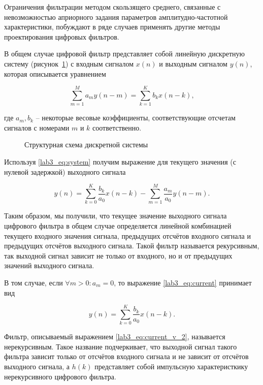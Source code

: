 Ограничения фильтрации методом скользящего среднего, связанные с невозможностью априорного задания параметров амплитудно-частотной характеристики, побуждают в ряде случаев применять другие методы проектирования цифровых фильтров.

В общем случае цифровой фильтр представляет собой линейную дискретную систему (рисунок~\ref{lab3_fig:structural_scheme}) с входным сигналом $x(n)$ и выходным сигналом $y(n)$, которая описывается уравнением

\begin{equation}
	\sum\limits_{m=1}^M a_m y (n-m) = \sum\limits_{k=1}^K b_k x (n-k),
	\label{lab3_eq:system}
\end{equation}

где $a_m, b_k$ – некоторые весовые коэффициенты, соответствующие отсчетам сигналов с номерами $m$ и $k$ соответственно.

\begin{figure}
	\centering
	
	\caption{Структурная схема дискретной системы}
	\label{lab3_fig:structural_scheme}
\end{figure}

Используя \eqref{lab3_eq:system} получим выражение для текущего значения (с нулевой задержкой) выходного сигнала

\begin{equation}
	y(n) = \sum\limits_{k=0}^K \frac{b_k}{a_0}x(n-k) - \sum\limits_{m=1}^M \frac{a_m}{a_0}y(n-m).
	\label{lab3_eq:current}
\end{equation}

Таким образом, мы получили, что текущее значение выходного сигнала цифрового фильтра в общем случае определяется линейной комбинацией текущего входного значения сигнала, предыдущих отсчётов входного сигнала и предыдущих отсчётов выходного сигнала. Такой фильтр называется рекурсивным, так выходной сигнал зависит не только от входного, но и от предыдущих значений выходного сигнала.

В том случае, если $ \forall m > 0: a_m = 0 $, то выражение \eqref{lab3_eq:current} принимает вид

\begin{equation}
	y(n) = \sum\limits_{k=0}^K \frac{b_k}{a_0}x(n-k).
	\label{lab3_eq:current_v_2}
\end{equation}

Фильтр, описываемый выражением \eqref{lab3_eq:current_v_2}, называется нерекурсивным. Такое название подчеркивает, что выходной сигнал такого фильтра зависит только от отсчётов входного сигнала и не зависит от отсчётов выходного сигнала, а $h(k)$ представляет собой импульсную характеристкику нерекурсивного цифрового фильтра.

